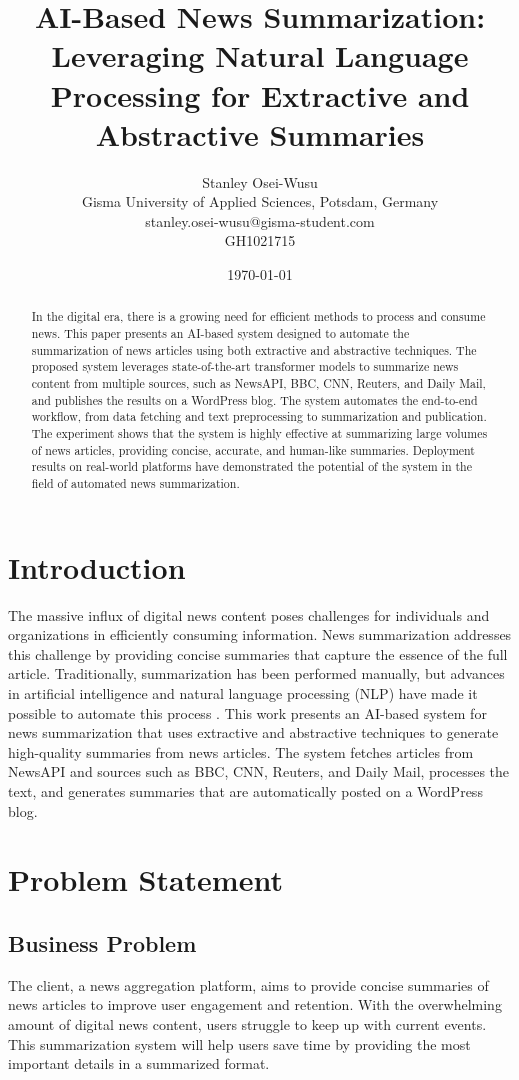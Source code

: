 \documentclass[12pt]{article}
\title{AI-Based News Summarization: Leveraging Natural Language Processing for Extractive and Abstractive Summaries}
\author{
    Stanley Osei-Wusu\\
    Gisma University of Applied Sciences, Potsdam, Germany\\
    stanley.osei-wusu@gisma-student.com\\GH1021715
}
\date{\today}
\begin{document}
\maketitle
\newpage
\begin{abstract}
In the digital era, there is a growing need for efficient methods to process and consume news. This paper presents an AI-based system designed to automate the summarization of news articles using both extractive and abstractive techniques. The proposed system leverages state-of-the-art transformer models to summarize news content from multiple sources, such as NewsAPI, BBC, CNN, Reuters, and Daily Mail, and publishes the results on a WordPress blog. The system automates the end-to-end workflow, from data fetching and text preprocessing to summarization and publication. The experiment shows that the system is highly effective at summarizing large volumes of news articles, providing concise, accurate, and human-like summaries. Deployment results on real-world platforms have demonstrated the potential of the system in the field of automated news summarization.
\end{abstract}

\section{Introduction}
The massive influx of digital news content poses challenges for individuals and organizations in efficiently consuming information. News summarization addresses this challenge by providing concise summaries that capture the essence of the full article. Traditionally, summarization has been performed manually, but advances in artificial intelligence and natural language processing (NLP) have made it possible to automate this process \citep{manning1999foundations}. This work presents an AI-based system for news summarization that uses extractive and abstractive techniques to generate high-quality summaries from news articles. The system fetches articles from NewsAPI \citep{newsapi} and sources such as BBC, CNN, Reuters, and Daily Mail, processes the text, and generates summaries that are automatically posted on a WordPress blog.

\section{Problem Statement}
\subsection{Business Problem}
The client, a news aggregation platform, aims to provide concise summaries of news articles to improve user engagement and retention. With the overwhelming amount of digital news content, users struggle to keep up with current events. This summarization system will help users save time by providing the most important details in a summarized format.
\end{document}
